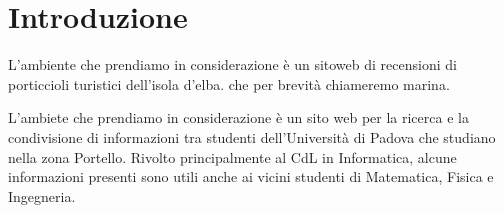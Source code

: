 \section{Introduzione}

L'ambiente che prendiamo in considerazione è un sitoweb di recensioni di porticcioli turistici dell'isola d'elba. che per brevità chiameremo marina.

L'ambiete che prendiamo in considerazione è un sito web per la ricerca e la condivisione di informazioni tra studenti dell'Università di Padova che studiano nella zona Portello. Rivolto principalmente al CdL in Informatica, alcune informazioni presenti sono utili anche ai vicini studenti di Matematica, Fisica e Ingegneria.